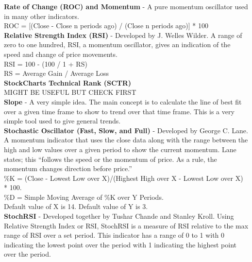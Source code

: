 \documentclass[12pt,a4paper]{article}
\begin{document}
\iffalse
[]
\fi

\noindent
\textbf{Rate of Change (ROC) and Momentum} - A pure momentum oscillator used in many other indicators.\\

\noindent
ROC = [(Close - Close n periods ago) / (Close n periods ago)] * 100 \\

\iffalse
[]
\fi

\noindent
\textbf{Relative Strength Index (RSI)} - Developed by J. Welles Wilder. A range of zero to one hundred, RSI, a momentum oscillator, gives an indication of the speed and change of price movements.\\

\noindent
RSI = 100 - (100 / 1 + RS) \\
RS = Average Gain / Average Loss\\

\iffalse
[]
\fi

\noindent
\textbf{StockCharts Technical Rank (SCTR)} \\

MIGHT BE USEFUL BUT CHECK FIRST\\

\iffalse
[]
\fi

\noindent
\textbf{Slope} - A very simple idea. The main concept is to calculate the line of best fit over a given time frame to show to trend over that time frame. This is a very simple tool used to give general trends.\\

\iffalse
[]
\fi

\noindent
\textbf{Stochastic Oscillator (Fast, Slow, and Full)} - Developed by George C. Lane. A momentum indicator that uses the close data along with the range between the high and low values over a given period to show the current momentum. Lane states; this ``follows the speed or the momentum of price. As a rule, the momentum changes direction before price.'' \\

\noindent
\%K = (Close - Lowest Low over X)/(Highest High over X - Lowest Low over X) * 100.\\
\%D = Simple Moving Average of \%K over Y Periods. \\
Default value of X is 14. Default value of Y is 3.\\

\iffalse
[]
\fi

\noindent
\textbf{StochRSI} - Developed together by Tushar Chande and Stanley Kroll. Using Relative Strength Index or RSI, StochRSI is a measure of RSI relative to the max range of RSI over a set period. This indicator has a range of 0 to 1 with 0 indicating the lowest point over the period with 1 indicating the highest point over the period.\\
\end{document}
